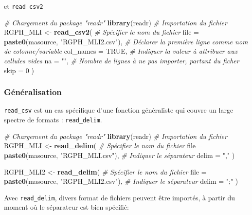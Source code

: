 \documentclass[]{book}
\newenvironment{Shaded}{\begin{snugshade}}{\end{snugshade}}
\newcommand{\KeywordTok}[1]{\textcolor[rgb]{0.13,0.29,0.53}{\textbf{#1}}}
\newcommand{\DataTypeTok}[1]{\textcolor[rgb]{0.13,0.29,0.53}{#1}}
\newcommand{\DecValTok}[1]{\textcolor[rgb]{0.00,0.00,0.81}{#1}}
\newcommand{\StringTok}[1]{\textcolor[rgb]{0.31,0.60,0.02}{#1}}
\newcommand{\CommentTok}[1]{\textcolor[rgb]{0.56,0.35,0.01}{\textit{#1}}}
\newcommand{\OtherTok}[1]{\textcolor[rgb]{0.56,0.35,0.01}{#1}}
\newcommand{\NormalTok}[1]{#1}
\begin{document}
et \texttt{read\_csv2}

\begin{Shaded}
\begin{Highlighting}[]
\CommentTok{# Chargement du package "readr"}
\KeywordTok{library}\NormalTok{(readr) }
\CommentTok{# Importation du fichier}
\NormalTok{RGPH_MLI <-}\StringTok{ }\KeywordTok{read_csv2}\NormalTok{(}
  \CommentTok{# Spécifier le nom du fichier}
  \DataTypeTok{file =} \KeywordTok{paste0}\NormalTok{(masource, }\StringTok{"RGPH_MLI2.csv"}\NormalTok{), }
  \CommentTok{# Déclarer la première ligne comme nom de colonne/variable}
  \DataTypeTok{col_names =} \OtherTok{TRUE}\NormalTok{, }
  \CommentTok{# Indiquer la valeur à attribuer aux cellules vides }
  \DataTypeTok{na =} \StringTok{""}\NormalTok{, }
  \CommentTok{# Nombre de lignes à ne pas importer, partant du ficher}
  \DataTypeTok{skip =} \DecValTok{0}
\NormalTok{  )}
\end{Highlighting}
\end{Shaded}

\subsubsection{Généralisation}\label{generalisation}

\texttt{read\_csv} est un cas spécifique d'une fonction généraliste qui
couvre un large spectre de formats : \texttt{read\_delim}.

\begin{Shaded}
\begin{Highlighting}[]
\CommentTok{# Chargement du package "readr"}
\KeywordTok{library}\NormalTok{(readr) }
\CommentTok{# Importation du fichier}
\NormalTok{RGPH_MLI <-}\StringTok{ }\KeywordTok{read_delim}\NormalTok{(}
  \CommentTok{# Spécifier le nom du fichier}
  \DataTypeTok{file =} \KeywordTok{paste0}\NormalTok{(masource, }\StringTok{"RGPH_MLI.csv"}\NormalTok{), }
  \CommentTok{# Indiquer le séparateur}
  \DataTypeTok{delim =} \StringTok{","}
\NormalTok{  )}

\NormalTok{RGPH_MLI2 <-}\StringTok{ }\KeywordTok{read_delim}\NormalTok{(}
  \CommentTok{# Spécifier le nom du fichier}
  \DataTypeTok{file =} \KeywordTok{paste0}\NormalTok{(masource, }\StringTok{"RGPH_MLI2.csv"}\NormalTok{), }
  \CommentTok{# Indiquer le séparateur}
  \DataTypeTok{delim =} \StringTok{";"}
\NormalTok{  )}
\end{Highlighting}
\end{Shaded}

Avec \texttt{read\_delim}, divers format de fichiers peuvent être
importés, à partir du moment où le séparateur est bien spécifié:
\end{document}
